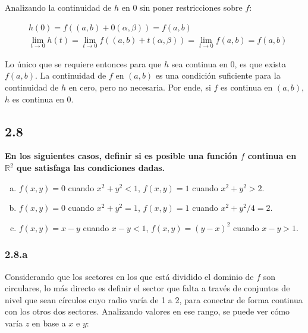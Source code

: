 \documentclass{article}
\renewcommand{\Bbb}{\mathbb}
\begin{document}
Analizando la continuidad de $h$ en 0 sin poner restricciones sobre $f$:

\begin{subequations}
\begin{align}
& h(0) = f((a,b) + 0 (\alpha, \beta) ) = f(a,b) \\
& \lim_{t \rightarrow 0} h(t) = \lim_{t \rightarrow 0} f((a,b) + t(\alpha, \beta)) = \lim_{t \rightarrow 0} f(a,b) = f(a,b)
\end{align}
\end{subequations}

Lo único que se requiere entonces para que $h$ sea continua en 0, es que exista $f(a,b)$. La continuidad de $f$ en $(a,b)$ es una condición suficiente para la continuidad de $h$ en cero, pero no necesaria. Por ende, si $f$ es continua en $(a,b)$, $h$ es continua en 0.

\subsection*{2.8}
\label{subsec:2.8}

\textbf{En los siguientes casos, definir si es posible una función $f$ continua en $\Bbb R^2$ que satisfaga las condiciones dadas.}

\begin{enumerate}[(a)]
\bfseries

\item $f(x,y) = 0$ cuando $x^2 + y^2 < 1$, $f(x,y) = 1$ cuando $x^2 + y^2 > 2$. 

\item $f(x,y) = 0$ cuando $x^2 + y^2 = 1$, $f(x,y) = 1$ cuando $x^2 + y^2/4 = 2$. 

\item $f(x,y) = x-y$ cuando $x - y < 1$, $f(x,y) = (y-x)^2$ cuando $x - y > 1$. 

\end{enumerate}

\subsubsection*{2.8.a}
\label{subsubsec:2.8.a}

Considerando que los sectores en los que está dividido el dominio de $f$ son circulares, lo más directo es definir el sector que falta a través de conjuntos de nivel que sean círculos cuyo radio varía de 1 a 2, para conectar de forma continua con los otros dos sectores. Analizando valores en ese rango, se puede ver cómo varía $z$ en base a $x$ e $y$:
\end{document}
